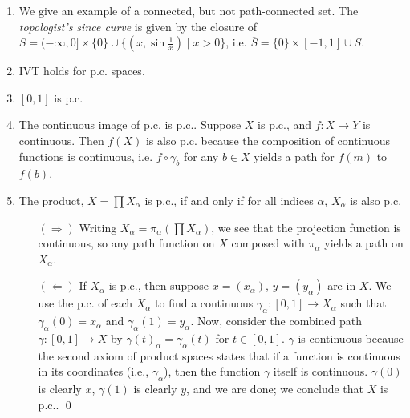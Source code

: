 \begin{enumerate}[label=(\alph*)]
    \item We give an example of a connected, but not path-connected set. The \textit{topologist's since curve} is given by the closure of $S = (-\infty, 0] \times \{0\} \cup \{(x, \sin \frac{1}{x}) \mid x > 0\}$, i.e. $\overline{S} = \{0\} \times [-1, 1] \cup S$.
    \item IVT holds for p.c. spaces.
    \item $[0, 1]$ is p.c.
    \item The continuous image of p.c. is p.c.. Suppose $X$ is p.c., and $f : X \to Y$ is continuous. Then $f(X)$ is also p.c. because the composition of continuous functions is continuous, i.e. $f \circ \gamma_b$ for any $b \in X$ yields a path for $f(m)$ to $f(b)$.
    \item The product, $X = \prod X_\alpha$ is p.c., if and only if for all indices $\alpha$, $X_\alpha$ is also p.c.
    \begin{itemize}
        \item[$(\Rightarrow)$] Writing $X_\alpha = \pi_\alpha (\prod X_\alpha)$, we see that the projection function is continuous, so any path function on $X$ composed with $\pi_\alpha$ yields a path on $X_\alpha$.
        \item[$(\Leftarrow)$] If $X_\alpha$ is p.c., then suppose $x = (x_\alpha)$, $y = (y_\alpha)$ are in $X$. We use the p.c. of each $X_\alpha$ to find a continuous $\gamma_\alpha : [0, 1] \to X_\alpha$ such that $\gamma_\alpha(0) = x_\alpha$ and $\gamma_\alpha(1) = y_\alpha$. Now, consider the combined path $\gamma : [0, 1] \to X$ by $\gamma(t)_\alpha = \gamma_\alpha(t)$ for $t \in [0, 1]$. $\gamma$ is continuous because the second axiom of product spaces states that if a function is continuous in its coordinates (i.e., $\gamma_\alpha$), then the function $\gamma$ itself is continuous. $\gamma(0)$ is clearly $x$, $\gamma(1)$ is clearly $y$, and we are done; we conclude that $X$ is p.c.. \qed
    \end{itemize}
\end{enumerate}
